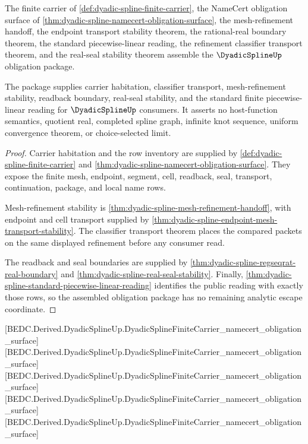 \begin{theorem}
\label{thm:dyadic-spline-obligation-closure-package}
The finite carrier of \autoref{def:dyadic-spline-finite-carrier}, the NameCert obligation surface of \autoref{thm:dyadic-spline-namecert-obligation-surface}, the mesh-refinement handoff, the endpoint transport stability theorem, the rational-real boundary theorem, the standard piecewise-linear reading, the refinement classifier transport theorem, and the real-seal stability theorem assemble the $\DyadicSplineUp$ obligation package.

The package supplies carrier habitation, classifier transport, mesh-refinement stability, readback boundary, real-seal stability, and the standard finite piecewise-linear reading for $\DyadicSplineUp$ consumers. It asserts no host-function semantics, quotient real, completed spline graph, infinite knot sequence, uniform convergence theorem, or choice-selected limit.
\end{theorem}
\begin{proof}
Carrier habitation and the row inventory are supplied by \autoref{def:dyadic-spline-finite-carrier} and \autoref{thm:dyadic-spline-namecert-obligation-surface}. They expose the finite mesh, endpoint, segment, cell, readback, seal, transport, continuation, package, and local name rows.

Mesh-refinement stability is \autoref{thm:dyadic-spline-mesh-refinement-handoff}, with endpoint and cell transport supplied by \autoref{thm:dyadic-spline-endpoint-mesh-transport-stability}. The classifier transport theorem places the compared packets on the same displayed refinement before any consumer read.

The readback and seal boundaries are supplied by \autoref{thm:dyadic-spline-regseqrat-real-boundary} and \autoref{thm:dyadic-spline-real-seal-stability}. Finally, \autoref{thm:dyadic-spline-standard-piecewise-linear-reading} identifies the public reading with exactly those rows, so the assembled obligation package has no remaining analytic escape coordinate.
\end{proof}

[BEDC.Derived.DyadicSplineUp.DyadicSplineFiniteCarrier\_namecert\_obligation\_surface]
[BEDC.Derived.DyadicSplineUp.DyadicSplineFiniteCarrier\_namecert\_obligation\_surface]
[BEDC.Derived.DyadicSplineUp.DyadicSplineFiniteCarrier\_namecert\_obligation\_surface]
[BEDC.Derived.DyadicSplineUp.DyadicSplineFiniteCarrier\_namecert\_obligation\_surface]
[BEDC.Derived.DyadicSplineUp.DyadicSplineFiniteCarrier\_namecert\_obligation\_surface]

